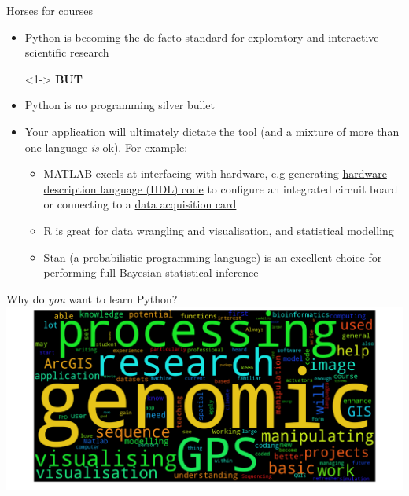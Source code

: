 \documentclass[pdf]{beamer}
\begin{document}
\begin{frame}{Horses for courses}

\begin{itemize}\addtolength{\itemsep}{0.5\baselineskip}
	\item<1-> Python is becoming the de facto standard for exploratory and interactive scientific research\\
	\item[]<1-> \textbf{BUT}
	\item<2-> Python is no programming silver bullet
	\item<3-> Your application will ultimately dictate the tool (and a mixture of more than one language \emph{is} ok). For example:\\
	\begin{itemize}\addtolength{\itemsep}{0.8\baselineskip}
		\item<4-> MATLAB excels at interfacing with hardware, e.g generating \href{https://uk.mathworks.com/products/hdl-coder.html}{hardware description language (HDL) code} to configure an integrated circuit board or connecting to a \href{https://uk.mathworks.com/products/daq.html}{data acquisition card}
		\item<5-> R is great for data wrangling and visualisation, and statistical modelling
		\item<6-> \href{http://mc-stan.org/}{Stan} (a probabilistic programming language) is an excellent choice for performing full Bayesian statistical inference
	\end{itemize}
\end{itemize}

\end{frame}

\begin{frame}{Why do \textit{you} want to learn Python?}
\centering
\includegraphics[width=\textwidth]{wordcloud.png}
\end{frame}
\end{document}
